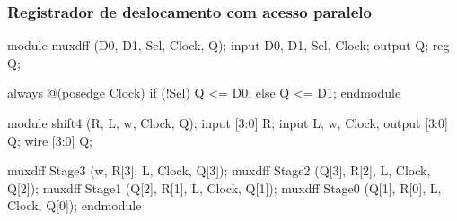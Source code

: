 
\begin{frame}[fragile]
	\frametitle{Registrador de deslocamento com acesso paralelo}
	\begin{verilogcode}
module muxdff (D0, D1, Sel, Clock, Q); 
  input D0, D1, Sel, Clock;
  output Q;
  reg Q;

  always @(posedge Clock) 
    if (!Sel)
      Q <= D0; 
    else
      Q <= D1; 
endmodule

module shift4 (R, L, w, Clock, Q); 
  input [3:0] R;
  input L, w, Clock;
  output [3:0] Q;
  wire [3:0] Q;
  
  muxdff Stage3 (w,    R[3], L, Clock, Q[3]); 
  muxdff Stage2 (Q[3], R[2], L, Clock, Q[2]); 
  muxdff Stage1 (Q[2], R[1], L, Clock, Q[1]); 
  muxdff Stage0 (Q[1], R[0], L, Clock, Q[0]);
endmodule
	\end{verilogcode}
\end{frame}

